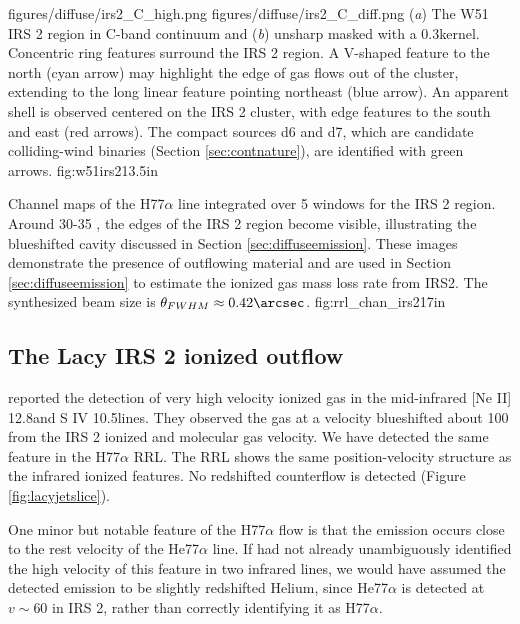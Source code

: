 \FigureTwo
{figures/diffuse/irs2_C_high.png}
{figures/diffuse/irs2_C_diff.png}
{(\textit{a}) The W51 IRS 2 region in C-band continuum and (\textit{b}) unsharp
masked with a 0.3\arcsec kernel.  Concentric ring features surround the IRS 2
region.  A V-shaped feature to the north (cyan arrow) may highlight the edge of
gas flows out of the cluster, extending to the long linear feature pointing
northeast (blue arrow).  An
apparent shell is observed centered on the IRS 2 cluster, with edge
features to the south and east (red arrows).  The compact sources d6 and d7,
which are candidate colliding-wind binaries (Section \ref{sec:contnature}),
are identified with green arrows.
}
{fig:w51irs2}{1}{3.5in}

{Channel maps of the H77$\alpha$ line integrated over 5 \kms windows
for the IRS 2 region.  Around 30-35 \kms, the edges of the IRS 2 region become
visible, illustrating the blueshifted cavity discussed in Section
\ref{sec:diffuseemission}.  These images demonstrate the presence of outflowing
material and are used in Section \ref{sec:diffuseemission} to estimate the
ionized gas mass loss rate from IRS2.
The synthesized beam size is $\theta_{FWHM}\approx0.42\arcsec$.
}
{fig:rrl_chan_irs2}{1}{7in}


\subsection{The Lacy IRS 2 ionized outflow}
\label{sec:lacyjet}
\citet{Lacy2007a} reported the detection of very high velocity ionized gas
in the mid-infrared [Ne II] 12.8\um and S IV 10.5\um lines.  They observed the
gas at a velocity blueshifted about 100 \kms from the IRS 2 ionized and molecular
gas velocity.  We have detected the same feature in the H77$\alpha$ RRL.
The RRL shows the same position-velocity structure as the infrared ionized
features.  No redshifted counterflow is detected (Figure \ref{fig:lacyjetslice}).

One minor but notable feature of the H77$\alpha$ flow is that the emission
occurs close to the rest velocity of the He77$\alpha$ line.  If
\citet{Lacy2007a} had not already unambiguously identified the high velocity of
this feature in two infrared lines, we would have assumed the detected emission
to be slightly redshifted Helium, since He77$\alpha$ is detected at $v\sim60$
\kms in IRS 2, rather than correctly identifying it as H77$\alpha$.

